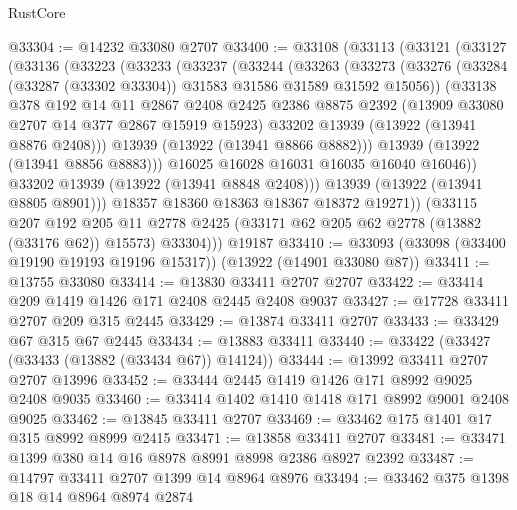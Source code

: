 \begin{lexlean}{RustCore}
\begin{coremodule}
@33304 := @14232 @33080 @2707
@33400 := @33108
    (@33113
      (@33121
        (@33127
          (@33136
            (@33223
              (@33233
                (@33237
                  (@33244
                    (@33263
                      (@33273
                        (@33276
                          (@33284 (@33287 (@33302 @33304)) @31583 @31586 @31589 @31592 @15056))
                        (@33138
                          @378
                          @192
                          @14
                          @11
                          @2867
                          @2408
                          @2425
                          @2386
                          @8875
                          @2392
                          (@13909 @33080 @2707 @14 @377 @2867 @15919 @15923)
                          @33202
                          @13939
                          (@13922 (@13941 @8876 @2408)))
                        @13939
                        (@13922 (@13941 @8866 @8882)))
                      @13939
                      (@13922 (@13941 @8856 @8883)))
                    @16025
                    @16028
                    @16031
                    @16035
                    @16040
                    @16046))
                @33202
                @13939
                (@13922 (@13941 @8848 @2408)))
              @13939
              (@13922 (@13941 @8805 @8901)))
            @18357
            @18360
            @18363
            @18367
            @18372
            @19271))
        (@33115
          @207
          @192
          @205
          @11
          @2778
          @2425
          (@33171 @62 @205 @62 @2778 (@13882 (@33176 @62)) @15573)
          @33304)))
    @19187
@33410 := @33093 (@33098 (@33400 @19190 @19193 @19196 @15317)) (@13922 (@14901 @33080 @87))
@33411 := @13755 @33080
@33414 := @13830 @33411 @2707 @2707
@33422 := @33414 @209 @1419 @1426 @171 @2408 @2445 @2408 @9037
@33427 := @17728 @33411 @2707 @209 @315 @2445
@33429 := @13874 @33411 @2707
@33433 := @33429 @67 @315 @67 @2445
@33434 := @13883 @33411
@33440 := @33422 (@33427 (@33433 (@13882 (@33434 @67)) @14124))
@33444 := @13992 @33411 @2707 @2707 @13996
@33452 := @33444 @2445 @1419 @1426 @171 @8992 @9025 @2408 @9035
@33460 := @33414 @1402 @1410 @1418 @171 @8992 @9001 @2408 @9025
@33462 := @13845 @33411 @2707
@33469 := @33462 @175 @1401 @17 @315 @8992 @8999 @2415
@33471 := @13858 @33411 @2707
@33481 := @33471 @1399 @380 @14 @16 @8978 @8991 @8998 @2386 @8927 @2392
@33487 := @14797 @33411 @2707 @1399 @14 @8964 @8976
@33494 := @33462 @375 @1398 @18 @14 @8964 @8974 @2874

\end{coremodule}
\end{lexlean}
